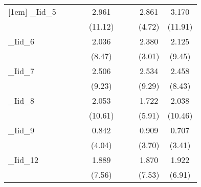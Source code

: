 {\begin{tabular}{l*{8}{c}}
[1em]
\_Iid\_5      &                     &                     &                     &       2.961\sym{***}&                     &                     &       2.861\sym{***}&       3.170\sym{***}\\
            &                     &                     &                     &     (11.12)         &                     &                     &      (4.72)         &     (11.91)         \\
[1em]
\_Iid\_6      &                     &                     &                     &       2.036\sym{***}&                     &                     &       2.380\sym{**} &       2.125\sym{***}\\
            &                     &                     &                     &      (8.47)         &                     &                     &      (3.01)         &      (9.45)         \\
[1em]
\_Iid\_7      &                     &                     &                     &       2.506\sym{***}&                     &                     &       2.534\sym{***}&       2.458\sym{***}\\
            &                     &                     &                     &      (9.23)         &                     &                     &      (9.29)         &      (8.43)         \\
[1em]
\_Iid\_8      &                     &                     &                     &       2.053\sym{***}&                     &                     &       1.722\sym{***}&       2.038\sym{***}\\
            &                     &                     &                     &     (10.61)         &                     &                     &      (5.91)         &     (10.46)         \\
[1em]
\_Iid\_9      &                     &                     &                     &       0.842\sym{***}&                     &                     &       0.909\sym{***}&       0.707\sym{***}\\
            &                     &                     &                     &      (4.04)         &                     &                     &      (3.70)         &      (3.41)         \\
[1em]
\_Iid\_12     &                     &                     &                     &       1.889\sym{***}&                     &                     &       1.870\sym{***}&       1.922\sym{***}\\
            &                     &                     &                     &      (7.56)         &                     &                     &      (7.53)         &      (6.91)         \\

\end{tabular}}
